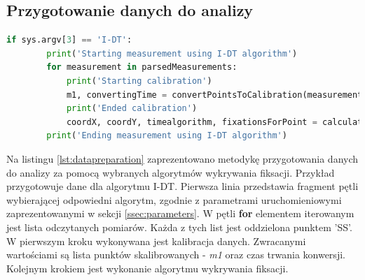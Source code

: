 \subsection{Przygotowanie danych do analizy}
\label{ssec:Dataanalysis}
\begin{lstlisting}[language=Python, caption=Przygotowanie danych do dalszej analizy, label={lst:datapreparation}]
        if sys.argv[3] == 'I-DT':
        print('Starting measurement using I-DT algorithm')
        for measurement in parsedMeasurements:
            print('Starting calibration')
            m1, convertingTime = convertPointsToCalibration(measurement)
            print('Ended calibration')
            coordX, coordY, timealgorithm, fixationsForPoint = calculateIdtAlgorithm(m1)
        print('Ending measurement using I-DT algorithm')
\end{lstlisting}
Na listingu \ref{lst:datapreparation} zaprezentowano metodykę przygotowania danych do analizy za pomocą wybranych algorytmów wykrywania fiksacji. Przykład przygotowuje dane dla algorytmu I-DT. Pierwsza linia przedstawia fragment pętli wybierającej odpowiedni algorytm, zgodnie z parametrami uruchomieniowymi zaprezentowanymi w sekcji \ref{ssec:parameters}. W pętli \textbf{for} elementem iterowanym jest lista odczytanych pomiarów. Każda z tych list jest oddzielona punktem 'SS'. W pierwszym kroku wykonywana jest kalibracja danych. Zwracanymi wartościami są lista punktów skalibrowanych - \emph{m1} oraz czas trwania konwersji. Kolejnym krokiem jest wykonanie algorytmu wykrywania fiksacji.
